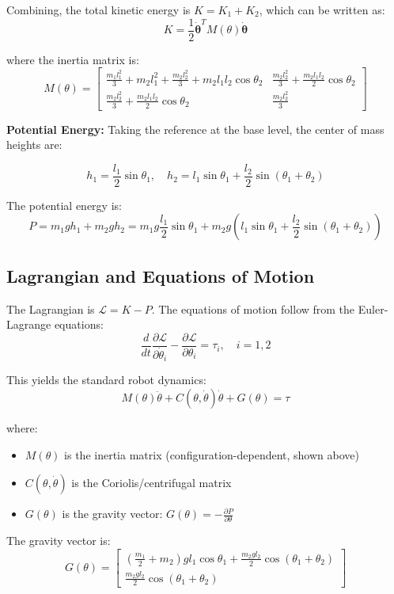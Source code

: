 Combining, the total kinetic energy is $K = K_1 + K_2$, which can be written as:
\[
K = \frac{1}{2} \dot{\boldsymbol{\theta}}^T M(\theta) \dot{\boldsymbol{\theta}}
\]

where the inertia matrix is:
\[
M(\theta) = \begin{bmatrix}
\frac{m_1 l_1^2}{3} + m_2 l_1^2 + \frac{m_2 l_2^2}{3} + m_2 l_1 l_2 \cos\theta_2 & \frac{m_2 l_2^2}{3} + \frac{m_2 l_1 l_2}{2} \cos\theta_2 \\
\frac{m_2 l_2^2}{3} + \frac{m_2 l_1 l_2}{2} \cos\theta_2 & \frac{m_2 l_2^2}{3}
\end{bmatrix}
\]

\textbf{Potential Energy:} Taking the reference at the base level, the center of mass heights are:

\[
h_1 = \frac{l_1}{2} \sin\theta_1, \quad h_2 = l_1 \sin\theta_1 + \frac{l_2}{2} \sin(\theta_1 + \theta_2)
\]

The potential energy is:
\[
P = m_1 g h_1 + m_2 g h_2 = m_1 g \frac{l_1}{2} \sin\theta_1 + m_2 g \left( l_1 \sin\theta_1 + \frac{l_2}{2} \sin(\theta_1 + \theta_2) \right)
\]

\subsection{Lagrangian and Equations of Motion}

The Lagrangian is $\mathcal{L} = K - P$. The equations of motion follow from the Euler-Lagrange equations:
\[
\frac{d}{dt} \frac{\partial \mathcal{L}}{\partial \dot{\theta}_i} - \frac{\partial \mathcal{L}}{\partial \theta_i} = \tau_i, \quad i = 1, 2
\]

This yields the standard robot dynamics:
\[
\boxed{M(\theta) \ddot{\theta} + C(\theta, \dot{\theta}) \dot{\theta} + G(\theta) = \tau}
\]

where:
\begin{itemize}
\item $M(\theta)$ is the inertia matrix (configuration-dependent, shown above)
\item $C(\theta, \dot{\theta})$ is the Coriolis/centrifugal matrix
\item $G(\theta)$ is the gravity vector: $G(\theta) = -\frac{\partial P}{\partial \theta}$
\end{itemize}

The gravity vector is:
\[
G(\theta) = \begin{bmatrix}
\left(\frac{m_1}{2} + m_2\right) g l_1 \cos\theta_1 + \frac{m_2 g l_2}{2} \cos(\theta_1 + \theta_2) \\
\frac{m_2 g l_2}{2} \cos(\theta_1 + \theta_2)
\end{bmatrix}
\]

